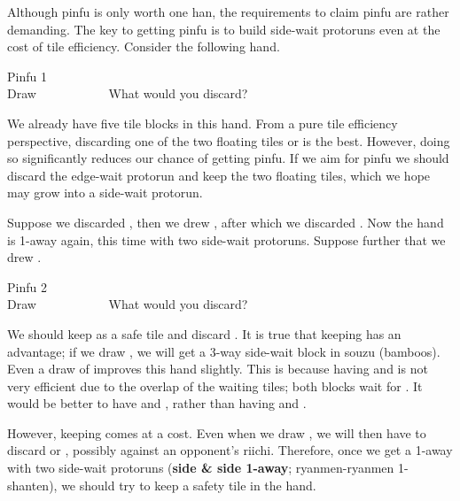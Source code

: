 Although {\jap pinfu} is only worth one {\jap han}, the requirements to claim {\jap pinfu} are rather demanding. The key to getting {\jap pinfu} is to build side-wait protoruns even at the cost of tile efficiency. Consider the following hand. 
\begin{itembox}[r]{{\jap Pinfu} 1}
\bp
{}~\\
\hfill\footnotesize{Draw~~~~~~~~~~~}
\ep
\vspace{-17pt}What would you discard? \vspace{-5pt}
\end{itembox}
\noindent
We already have five tile blocks in this hand. From a pure tile efficiency perspective, discarding one of the two floating tiles {\LARGE{}} or {\LARGE{}} is the best. However, doing so significantly reduces our chance of getting {\jap pinfu}. If we aim for {\jap pinfu} we should discard the edge-wait protorun {\LARGE{}} and keep the two floating tiles, which we hope may grow into a side-wait protorun. 

\bigskip
Suppose we discarded {\LARGE{}}, then we drew {\LARGE{}}, after which we discarded {\LARGE{}}. Now the hand is 1-away again, this time with two side-wait protoruns. Suppose further that we drew {\LARGE\xi}. 
\begin{itembox}[r]{{\jap Pinfu} 2}
\bp
{}~\xi\\
\hfill\footnotesize{Draw~~~~~~~~~~~}
\ep
\vspace{-17pt}What would you discard? \vspace{-5pt}
\end{itembox}
\noindent
We should keep {\LARGE\xi} as a safe tile and discard {\LARGE{}}. It is true that keeping {\LARGE{}} has an advantage; if we draw {\LARGE{}}, we will get a 3-way side-wait block in {\jap souzu} (bamboos). Even a draw of {\LARGE{}} improves this hand slightly. This is because having {\LARGE{}} and {\LARGE{}} is not very efficient due to the overlap of the waiting tiles; both blocks wait for {\LARGE{}}. It would be better to have {\LARGE{}} and {\LARGE{}}, rather than having {\LARGE{}} and {\LARGE{}}.

\bigskip
However, keeping {\LARGE{}} comes at a cost. Even when we draw {\LARGE{}}, we will then have to discard {\LARGE{}} or {\LARGE{}}, possibly against an opponent's riichi. 
Therefore, once we get a 1-away with two side-wait protoruns ({\bf side \& side 1-away}; {\jap ryanmen-ryanmen 1-shanten}), we should try to keep a safety tile in the hand.

